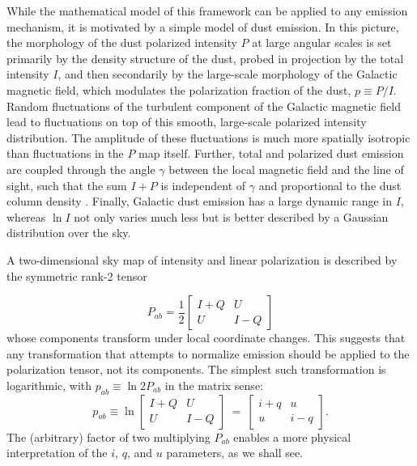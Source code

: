 \documentclass[twocolumn]{aastex631}
\begin{document}
While the mathematical model of this framework can be applied to any emission mechanism, it is motivated by a simple model of dust emission. In this picture, the morphology of the dust polarized intensity $P$ at large angular scales is set primarily by the density structure of the dust, probed in projection by the total intensity $I$, and then secondarily by the large-scale morphology of the Galactic magnetic field, which modulates the polarization fraction of the dust, $p \equiv P/I$. Random fluctuations of the turbulent component of the Galactic magnetic field lead to fluctuations on top of this smooth, large-scale polarized intensity distribution. The amplitude of these fluctuations is much more spatially isotropic than fluctuations in the $P$ map itself. Further, total and polarized dust emission are coupled through the angle $\gamma$ between the local magnetic field and the line of sight, such that the sum $I+P$ is independent of $\gamma$ and proportional to the dust column density \citep{Hensley:2019}. Finally, Galactic dust emission has a large dynamic range in $I$, whereas $\ln I$ not only varies much less but is better described by a Gaussian distribution over the sky.

A two-dimensional sky map of intensity and linear polarization is described by the symmetric rank-2 tensor \citep[e.g.,][]{Landau:1975}

\begin{equation}
    P_{ab} = \frac{1}{2} \left[ \begin{matrix} I+Q & U \\ U & I-Q \end{matrix} \right]
\end{equation}
whose components transform under local coordinate changes. This suggests that any transformation that attempts to normalize emission should be applied to the polarization tensor, not its components. The simplest such transformation is logarithmic, with $p_{ab} \equiv \ln 2 P_{ab}$ in the matrix sense:
\begin{equation}\label{eq:logP}
p_{ab} \equiv \ln \left[ \begin{matrix} I+Q & U \\ U & I-Q \end{matrix} \right] \ = \ 
    \left[ \begin{matrix} i+q & u \\ u & i-q \end{matrix} \right].
\end{equation}
The (arbitrary) factor of two multiplying $P_{ab}$ enables a more physical interpretation of the $i$, $q$, and $u$ parameters, as we shall see.
\end{document}

